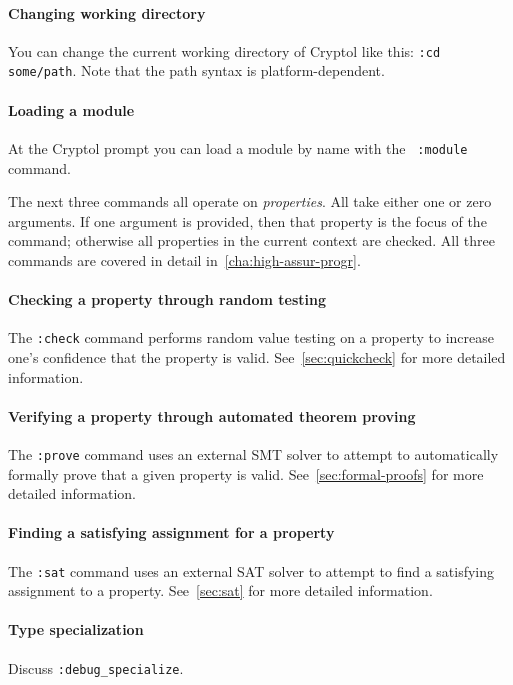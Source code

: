 \paragraph*{Changing working directory}
You can change the current working directory of Cryptol like this:
\texttt{:cd some/path}.  Note that the path syntax is
platform-dependent.

\paragraph*{Loading a module}
At the Cryptol prompt you can load a module by name with the {\tt
  :module} command.\indCmdLoadModule

The next three commands all operate on \emph{properties}.  All take
either one or zero arguments.  If one argument is provided, then that
property is the focus of the command; otherwise all properties in the
current context are checked.  All three commands are covered in detail
in~\autoref{cha:high-assur-progr}.

\paragraph*{Checking a property through random testing}
The \texttt{:check} command performs random value testing on a
property to increase one's confidence that the property is valid.
See~\autoref{sec:quickcheck} for more detailed information.

\paragraph*{Verifying a property through automated theorem proving}
The \texttt{:prove} command uses an external SMT solver to attempt to
automatically formally prove that a given property is valid.
See~\autoref{sec:formal-proofs} for more detailed information.

\paragraph*{Finding a satisfying assignment for a property}
The \texttt{:sat} command uses an external SAT solver to attempt to
find a satisfying assignment to a property.  See~\autoref{sec:sat} for
more detailed information.

\paragraph*{Type specialization}
Discuss \texttt{:debug\_specialize}.  

